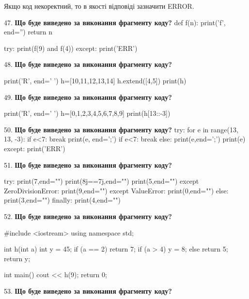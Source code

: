 \documentclass[11pt]{article}
\begin{document}
Якщо код некоректний, то в якості відповіді зазначити ERROR.


\par\vspace{5mm}
47. \textbf{Що буде виведено за виконання фрагменту коду?}
def f(n):
    print('f', end='')
    return n

try:
    print(f(9) and f(4))
except:
    print('ERR')
\par\vspace{5mm}
48. \textbf{Що буде виведено за виконання фрагменту коду?}

print('R', end=' ')
h=[10,11,12,13,14]
h.extend([4,5])
print(h)

\par\vspace{5mm}
49. \textbf{Що буде виведено за виконання фрагменту коду?}

print('R', end=' ')
h=[0,1,2,3,4,5,6,7,8,9]
print(h[13::-3])

\par\vspace{5mm}
50. \textbf{Що буде виведено за виконання фрагменту коду?}
try:
    for e in range(13, 13, -3):
        if e<7:
            break
        print(e, end=';')
        if e<7:
            break
    else:
        print(e,end=';')
    print(e)
except:
    print('ERR')
\par\vspace{5mm}
51. \textbf{Що буде виведено за виконання фрагменту коду?}

try:
    print(7,end="")
    print(8j==7j,end="")
    print(5,end="")
except ZeroDivisionError: print(9,end="")
except ValueError: print(0,end="")
else: print(3,end="")
finally: print(4,end="")
\par\vspace{5mm}
52. \textbf{Що буде виведено за виконання фрагменту коду?}

#include <iostream>
using namespace std;

int h(int a){
    int y = 45;
    if (a == 2) 
        return 7;
    if (a > 4)
         y = 8;
    else
         return 5;
    return y;
}

int main(){
    cout << h(9);
    return 0;
}

\par\vspace{5mm}
53. \textbf{Що буде виведено за виконання фрагменту коду?}
\end{document}
